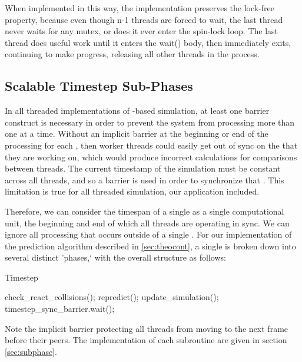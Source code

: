 \documentclass[conference]{IEEEtran}
\begin{document}
When implemented in this way, the implementation preserves the lock-free property, because even though n-1 threads are forced to wait, the last thread never waits for any 
mutex, or does it ever enter the spin-lock loop.  The last thread does useful work until it enters the wait() body, then immediately exits, continuing to make progress, releasing all
other threads in the process.

\subsection{Scalable Timestep Sub-Phases}
\label{sec:stsp}
In all threaded implementations of -based simulation, at least one barrier construct
is necessary in order to prevent the system from processing more than one  at a time.  Without an implicit barrier at the beginning or end of the 
processing for each , then worker threads could easily get out of sync on the  that they are working on, which would produce incorrect calculations
for comparisons between threads.  The current timestamp of the simulation must be constant across all threads, and so a barrier is used in order to synchronize that .  This
limitation is true for all threaded  simulation, our application included.

Therefore, we can consider the timespan of a single  as a single computational unit, the beginning and end of which all threads are operating in sync.  We can ignore
all processing that occurs outside of a single .  For our implementation of the prediction algorithm described in \ref{sec:theocont}, a single  is broken down
into several distinct 'phases,` with the overall structure as follows:

\begin{algorithm}
\caption{Timestep}
\begin{algorithmic}
\STATE check\_react\_collisions();
\STATE repredict();
\STATE update\_simulation();
\STATE timestep\_sync\_barrier.wait();
\end{algorithmic}
\end{algorithm}

Note the implicit barrier protecting all threads from moving to the next frame before their peers.  The implementation of each subroutine are given in section \ref{sec:subphase}.
\end{document}
